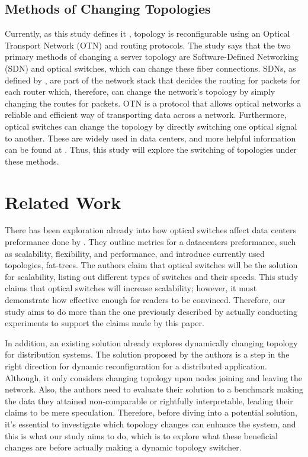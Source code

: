 \subsection{Methods of Changing Topologies}

\indent Currently, as this study defines it \cite{hall_survey_2021}, topology is reconfigurable using an Optical Transport Network (OTN) and routing protocols. The study says that the two primary methods of changing a server topology are Software-Defined Networking (SDN) and optical switches, which can change these fiber connections. SDNs, as defined by \cite{kurose2021computer}, are part of the network stack that decides the routing for packets for each router which, therefore, can change the network's topology by simply changing the routes for packets. OTN is a protocol that allows optical networks a reliable and efficient way of transporting data across a network. Furthermore, optical switches can change the topology by directly switching one optical signal to another. These are widely used in data centers, and more helpful information can be found at \cite{nandi2022optical}. Thus, this study will explore the switching of topologies under these methods.

\section{Related Work}

There has been exploration already into how optical switches affect data centers preformance done by \cite{xue2023optical}. They outline metrics for a datacenters preformance, such as scalability, flexibility, and performance, and introduce currently used topologies, fat-trees. The authors claim that optical switches will be the solution for scalability, listing out different types of switches and their speeds. This study claims that optical switches will increase scalability; however, it must demonstrate how effective enough for readers to be convinced. Therefore, our study aims to do more than the one previously described by actually conducting experiments to support the claims made by this paper.

	In addition, an existing solution already explores dynamically changing topology \cite{wen2018dynamic} for distribution systems. The solution proposed by the authors is a step in the right direction for dynamic reconfiguration for a distributed application. Although, it only considers changing topology upon nodes joining and leaving the network. Also, the authors need to evaluate their solution to a benchmark making the data they attained non-comparable or rightfully interpretable, leading their claims to be mere speculation. Therefore, before diving into a potential solution, it's essential to investigate which topology changes can enhance the system, and this is what our study aims to do, which is to explore what these beneficial changes are before actually making a dynamic topology switcher.
	
